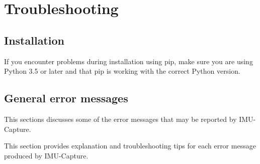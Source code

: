 \documentclass[11pt,letterpaper,article,oneside]{memoir}
\newcommand{\name}{IMU-Capture}
\begin{document}
\chapter{Troubleshooting}

\section{Installation}

If you encounter problems during installation using pip, make sure you are using
Python 3.5 or later and that pip is working with the correct Python version.


\section{General error messages}

This sections discusses some of the error messages that may be reported by
\name{}.


\newcommand{\genericFix}{Try resetting the Arduino.  Make sure that the Arduino
is correctly powered and connected to the PC (Section \ref{sec:wiring}), and
that the correct code is installed on the Arduino (Section
\ref{sec:installarduinocode}).}

This section provides explanation and troubleshooting tips for each error
message produced by \name{}.
\end{document}
